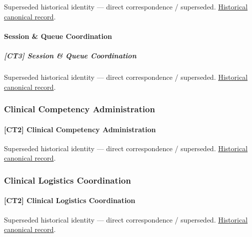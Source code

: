 \par\label{element:0856d2daf2ba4b92b5390b38b98efb54}
Superseded historical identity — direct correspondence / superseded. \href{../../../../continuum/strategy/capability/0856d2daf2ba4b92b5390b38b98efb54.md}{Historical canonical record}.\par

\paragraph{Session \& Queue Coordination}

\subparagraph{[CT3] Session \& Queue Coordination}

\par\label{element:5298c6170cef4f05a6d956da716071bd}
Superseded historical identity — direct correspondence / superseded. \href{../../../../continuum/strategy/capability/5298c6170cef4f05a6d956da716071bd.md}{Historical canonical record}.\par

\subsubsection{Clinical Competency Administration}

\paragraph{[CT2] Clinical Competency Administration}

\par\label{element:8a4b918e1c9d47bb99daf2b42008ab39}
Superseded historical identity — direct correspondence / superseded. \href{../../../../continuum/strategy/capability/8a4b918e1c9d47bb99daf2b42008ab39.md}{Historical canonical record}.\par

\subsubsection{Clinical Logistics Coordination}

\paragraph{[CT2] Clinical Logistics Coordination}

\par\label{element:90a782ff2d004fa984ae0465528b2253}
Superseded historical identity — direct correspondence / superseded. \href{../../../../continuum/strategy/capability/90a782ff2d004fa984ae0465528b2253.md}{Historical canonical record}.\par

